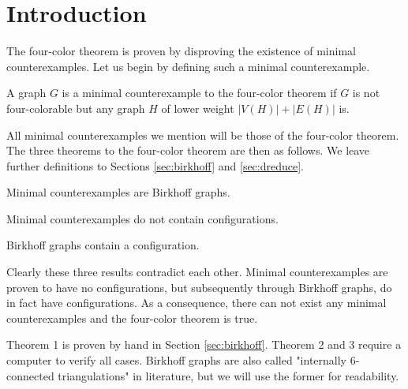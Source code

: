 \section{Introduction}

The four-color theorem is proven by disproving the existence of minimal counterexamples. Let us begin by defining such a minimal counterexample.
\begin{definition}
A graph $G$ is a minimal counterexample to the four-color theorem if $G$ is not four-colorable but any graph $H$ of lower weight $|V(H)|+|E(H)|$ is.
\end{definition}

All minimal counterexamples we mention will be those of the four-color theorem.
The three theorems to the four-color theorem are then as follows. We leave further definitions to Sections \ref{sec:birkhoff} and \ref{sec:dreduce}.

\begin{theorem}
Minimal counterexamples are Birkhoff graphs.
\end{theorem}

\begin{theorem}
Minimal counterexamples do not contain configurations.
\end{theorem}

\begin{theorem}
Birkhoff graphs contain a configuration.
\end{theorem}

Clearly these three results contradict each other. Minimal counterexamples are proven to have no configurations, but subsequently through Birkhoff graphs, do in fact have configurations. As a consequence, there can not exist any minimal counterexamples and the four-color theorem is true. 

Theorem 1 is proven by hand in Section \ref{sec:birkhoff}. Theorem 2 and 3 require a computer to verify all cases. Birkhoff graphs are also called "internally 6-connected triangulations" in literature, but we will use the former for readability.
